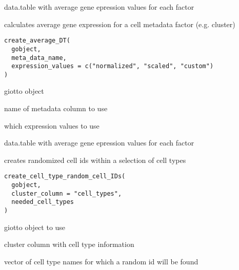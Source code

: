 \documentclass[a4paper]{book}
\begin{document}
%
\begin{Value}
data.table with average gene epression values for each factor
\end{Value}
%
\begin{Description}\relax
calculates average gene expression for a cell metadata factor (e.g. cluster)
\end{Description}
%
\begin{Usage}
\begin{verbatim}
create_average_DT(
  gobject,
  meta_data_name,
  expression_values = c("normalized", "scaled", "custom")
)
\end{verbatim}
\end{Usage}
%
\begin{Arguments}
\begin{ldescription}
\item[\code{gobject}] giotto object

\item[\code{meta\_data\_name}] name of metadata column to use

\item[\code{expression\_values}] which expression values to use
\end{ldescription}
\end{Arguments}
%
\begin{Value}
data.table with average gene epression values for each factor
\end{Value}
%
\begin{Description}\relax
creates randomized cell ids within a selection of cell types
\end{Description}
%
\begin{Usage}
\begin{verbatim}
create_cell_type_random_cell_IDs(
  gobject,
  cluster_column = "cell_types",
  needed_cell_types
)
\end{verbatim}
\end{Usage}
%
\begin{Arguments}
\begin{ldescription}
\item[\code{gobject}] giotto object to use

\item[\code{cluster\_column}] cluster column with cell type information

\item[\code{needed\_cell\_types}] vector of cell type names for which a random id will be found
\end{ldescription}
\end{Arguments}
\end{document}
